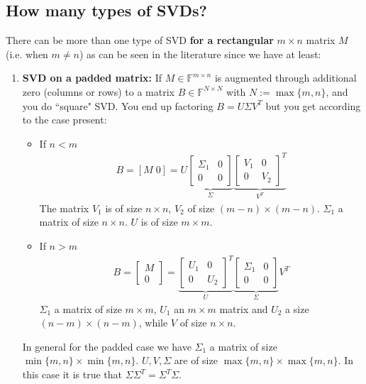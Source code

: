 \documentclass[11.5pt]{article}
\theoremstyle{definition}
\begin{document}
\subsection{How many types of SVDs?}
There can be more than one type of SVD \textbf{for a rectangular} $m\times n$ matrix $M$ (i.e. when $m\neq n$) as can be seen in the literature since we have at least:
\begin{enumerate}
\item \textbf{SVD on a padded matrix:} If $M\in\mathbb{F}^{m\times n}$ is augmented through additional zero (columns or rows) to a matrix $B\in \mathbb{F}^{N\times N}$ with $N:=\max\{m,n\}$, and you do ``square" SVD. You end up factoring $B=U\Sigma V^T$ but you get according to the case present:
\begin{itemize}
\item If $n<m$
\begin{align*}
B= [M\; 0]=U \underbrace{
\begin{bmatrix}
\Sigma_1 & 0 \\ 
0 & 0
\end{bmatrix}}_{{\Sigma}}
\underbrace{\begin{bmatrix}
V_1 & 0 \\ 
0 & V_2
\end{bmatrix}^T}_{V^T}
\end{align*}
The matrix $V_1$ is of size $n\times n$, $V_2$ of size $(m-n)\times (m-n)$. $\Sigma_1$ a matrix of size $n\times n$. $U$ is of size $m\times m$.
\item If $n>m$ 
\begin{align*}
B= 
\begin{bmatrix}
M \\ 
0
\end{bmatrix} 
 =
\underbrace{\begin{bmatrix}
U_1 & 0 \\ 
0 & U_2
\end{bmatrix}^T}_{U} 
  \underbrace{
\begin{bmatrix}
\Sigma_1 & 0 \\ 
0 & 0
\end{bmatrix}}_{{\Sigma}}
V^T
\end{align*}
$\Sigma_1$ a matrix of size $m\times m$, $U_1$ an $m\times m$ matrix and $U_2$ a size $(n-m)\times (n-m)$, while $V$ of size $n\times n$.
\end{itemize}
In general for the padded case we have $\Sigma_1$ a matrix of size $\min\{m,n\}\times \min\{m,n\}$. $U, V, \Sigma$ are of size $\max\{m,n\}\times \max\{m,n\}$. In this case it is true that $\Sigma\Sigma^T=\Sigma^T\Sigma$.


\end{enumerate}
\end{document}
